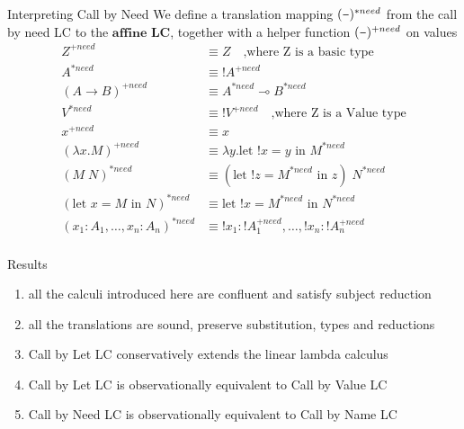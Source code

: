 \documentclass[10pt]{beamer}
\newcommand{\lam}[2]{\lambda #1 . #2}
\newcommand{\llet}[3]{\text{let }  ! #1 = #2 \text{ in } #3}
\newcommand{\plet}[3]{\text{let }   #1 = #2 \text{ in } #3}
\newcommand{\app}[2]{#1 \; #2}
\newcommand{\minus}{\scalebox{0.75}[1.0]{$-$}}
\begin{document}
\begin{frame}[fragile]{Interpreting Call by Need}
  We define a translation mapping $(\minus)^{*need}$ from the call by need LC to the $\textbf{affine LC}$, together with a helper function $(\minus)^{+need}$ on values \\
  \begin{align*}
    Z^{+need}                             & \equiv Z \quad \text{,where Z is a basic type}             \\
    A^{*need}                             & \equiv ! A^{+need}                                         \\
    (A \rightarrow B)^{+need}             & \equiv A^{*need} \multimap B^{*need}                       \\
    V^{*need}                             & \equiv ! V^{+need} \quad \text{,where Z is a Value type}   \\
    x^{+need}                             & \equiv x                                                   \\
    (\lam{x}{M})^{+need}                  & \equiv \lam{y}{\llet{x}{y}{M^{*need}}}                     \\
    (\app{M}{N})^{*need}                  & \equiv \app{(\llet{z}{M^{*need}}{z})}{N^{*need}}           \\
    (\plet{x}{M}{N})^{*need}              & \equiv \llet{x}{M^{*need}}{N^{*need}}                      \\
    (x_1 : A_1, \dots, x_n : A_n)^{*need} & \equiv ! x_1 : ! A_1^{+need}, \dots, ! x_n : ! A_n^{+need} \\
  \end{align*}
\end{frame}

\begin{frame}[fragile]{Results}
  \begin{enumerate}[<+->]
    \item all the calculi introduced here are confluent and satisfy subject reduction
    \item all the translations are sound, preserve substitution, types and reductions
    \item Call by Let LC conservatively extends the linear lambda calculus
    \item Call by Let LC is observationally equivalent to Call by Value LC
    \item Call by Need LC is observationally equivalent to Call by Name LC
  \end{enumerate}
\end{frame}
\end{document}
